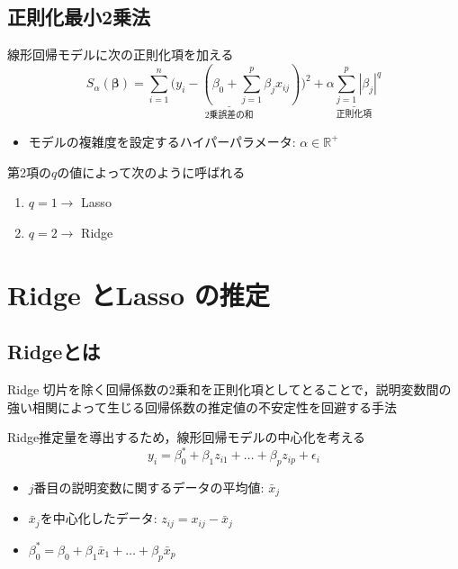 \documentclass[dvipdfmx, 10pt]{beamer}
\begin{document}
\subsection{正則化最小2乗法}
\begin{frame}{\insertsubsection}
    線形回帰モデルに次の正則化項を加える
    \begin{equation}
        S_{\alpha}(\bm{\beta}) = 
        \underset{\text{2乗誤差の和}}{\underline{
            \sum_{i=1}^{n}\bigl(
        		y_i - (
        			\beta_0 + \sum_{j=1}^{p} \beta_j {x}_{ij}
        		)
            \bigr)^2
        }}
    	 +  \underset{\text{正則化項}}{\underline{
            \alpha \sum_{j=1}^{p} |\beta_j|^q
        }}
    	\label{eq:extendLinearRegression}
    \end{equation}
    \begin{itemize}
        \item モデルの複雑度を設定するハイパーパラメータ: $\alpha \in \mathbb{R}^+$
     \end{itemize}
     \vspace{10pt}
    第2項の$q$の値によって次のように呼ばれる
    \begin{enumerate}
        \item $q=1 \rightarrow$ Lasso
        \item $q=2 \rightarrow$ Ridge
    \end{enumerate}
\end{frame}

\section{Ridge とLasso の推定}
\subsection{Ridgeとは}
\begin{frame}{\insertsubsection}
    \begin{block}{Ridge}
        切片を除く回帰係数の2乗和を正則化項としてとることで，説明変数間の強い相関によって生じる回帰係数の推定値の不安定性を回避する手法
    \end{block}
    \vspace{10pt}
    Ridge推定量を導出するため，線形回帰モデルの中心化を考える
    \begin{equation}
        y_i = \beta_0^* + \beta_1 z_{i1} + \dots + \beta_p z_{ip} + \epsilon_i
	\label{eq:linear_model_centering}
    \end{equation}
    \begin{itemize}
    	\item $j$番目の説明変数に関するデータの平均値: $\bar{x}_j$
	\item  $\bar{x}_j$を中心化したデータ: $z_{ij}=x_{ij} - \bar{x}_j$
	\item $\beta_0^* = \beta_0 + \beta_1 \bar{x}_{1} + \dots + \beta_p \bar{x}_{p}$
    \end{itemize}
\end{frame}
\end{document}
